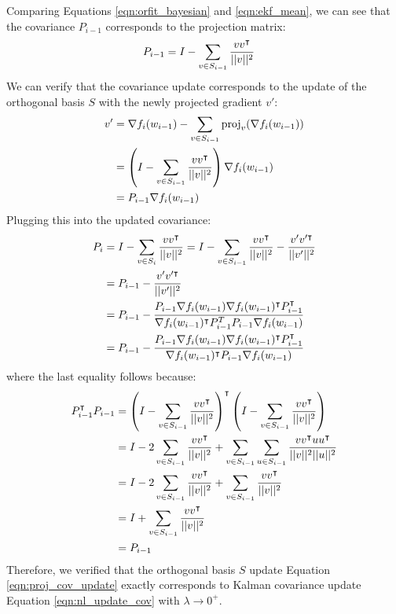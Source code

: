 Comparing Equations \ref{eqn:orfit_bayesian} and \ref{eqn:ekf_mean}, we can see that the covariance $P_{i-1}$
corresponds to the projection matrix:
\begin{align}
    P_{i-1} &= I - \sum_{v \in S_{i-1}} \frac{v v^{\intercal}}{||v||^2}
\end{align}
We can verify that the covariance update corresponds to the update of the orthogonal basis $S$ with
the newly projected gradient $v'$:
\begin{align}
    v' &= \nabla f_i(w_{i-1}) - \sum_{v \in S_{i-1}} \mathrm{proj}_v (\nabla f_i(w_{i-1})) \\
    &= \left( I - \sum_{v \in S_{i-1}} \frac{v v^{\intercal}}{||v||^2} \right)  \nabla f_i(w_{i-1}) \\
    &= P_{i-1} \nabla f_i(w_{i-1})
\end{align}
Plugging this into the updated covariance:
\begin{align}
    P_{i} &= I - \sum_{v \in S_{i}} \frac{v v^{\intercal}}{||v||^2} = I - \sum_{v \in S_{i-1}} \frac{v v^{\intercal}}{||v||^2} - 
    \frac{v'v'^{\intercal}}{||v'||^2} \\
    &= P_{i-1} -  \frac{v'v'^{\intercal}}{||v'||^2} \\
    &= P_{i-1} - \frac{P_{i-1} \nabla f_i(w_{i-1}) \nabla f_i(w_{i-1})^{\intercal} P_{i-1}^{\intercal}}{\nabla f_i(w_{i-1})^{\intercal} P_{i-1}^{T} P_{i-1} \nabla f_i(w_{i-1})} \\
    &= P_{i-1} - \frac{P_{i-1} \nabla f_i(w_{i-1}) \nabla f_i(w_{i-1})^{\intercal} P_{i-1}^{\intercal}}{\nabla f_i(w_{i-1})^{\intercal} P_{i-1} \nabla f_i(w_{i-1})} \label{eqn:proj_cov_update}
\end{align}
where the last equality follows because:
\begin{align}
    P_{i-1}^{\intercal}P_{i-1} &= \left( I - \sum_{v \in S_{i-1}} \frac{v v^{\intercal}}{||v||^2} \right)^{\intercal} 
    \left( I - \sum_{v \in S_{i-1}} \frac{v v^{\intercal}}{||v||^2} \right) \\
    &= I - 2 \sum_{v \in S_{i-1}} \frac{v v^{\intercal}}{||v||^2} + \sum_{v \in S_{i-1}} \sum_{u \in S_{i-1}} 
    \frac{v v^{\intercal} u u^{\intercal}}{||v||^2||u||^{2}} \\
    &= I - 2 \sum_{v \in S_{i-1}} \frac{v v^{\intercal}}{||v||^2} + \sum_{v \in S_{i-1}} \frac{v v^{\intercal}}{||v||^2} \\
    &= I + \sum_{v \in S_{i-1}} \frac{v v^{\intercal}}{||v||^2} \\
    &= P_{i-1}
\end{align}
Therefore, we verified that the orthogonal basis $S$ update Equation \ref{eqn:proj_cov_update}
exactly corresponds to Kalman covariance update Equation \ref{eqn:nl_update_cov} with $\lambda \to 0^{+}$.

